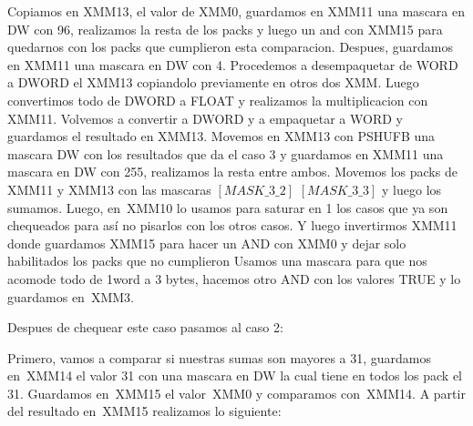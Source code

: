 Copiamos en XMM13, el valor de XMM0, guardamos en XMM11 una mascara en DW con 96, realizamos la resta de los packs y luego un and 
con XMM15 para quedarnos con los packs que cumplieron esta comparacion. Despues, guardamos en XMM11 una mascara en DW con 4.
Procedemos a desempaquetar de WORD a DWORD el XMM13 copiandolo previamente en otros dos XMM. Luego convertimos todo de DWORD
a FLOAT y realizamos la multiplicacion con XMM11. Volvemos a convertir a DWORD y a empaquetar a WORD y guardamos el resultado 
en XMM13. \newline
Movemos en XMM13 con PSHUFB una mascara DW con los resultados que da el caso 3 y guardamos en XMM11 una mascara en DW con 255, 
realizamos la resta entre ambos. Movemos los packs de XMM11 y XMM13 con las mascaras $[MASK\_3\_2]$ $[MASK\_3\_3] $ y luego
los sumamos. \newline
Luego, en\ XMM10 lo usamos para saturar en 1 los casos que ya son chequeados para así no pisarlos con los otros casos. Y luego
invertirmos XMM11 donde guardamos XMM15 para hacer un AND con XMM0 y dejar solo habilitados los packs que no cumplieron\newline
Usamos una mascara para que nos acomode todo de 1word a 3 bytes, hacemos otro AND con los valores TRUE y lo guardamos en\ XMM3. \newline

Despues de chequear este caso pasamos al caso 2: \newline

Primero, vamos a comparar si nuestras sumas son mayores a 31, guardamos en\ XMM14 el valor 31 con una mascara en DW la cual tiene en todos los pack
el 31. Guardamos en\ XMM15 el valor\ XMM0 y comparamos con\ XMM14.
A partir del resultado en\ XMM15 realizamos lo siguiente: \newline

